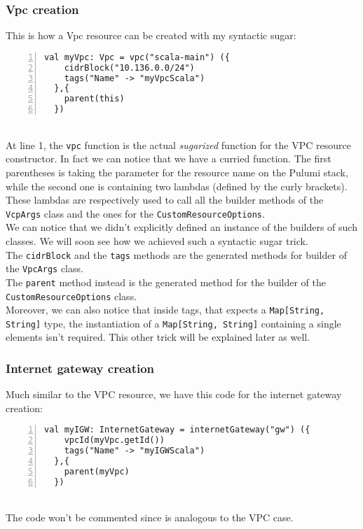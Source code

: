 \subsubsection{Vpc creation}
\label{sssec:vpc-creation-scala}
This is how a Vpc resource can be created with my syntactic sugar:
\begin{lstlisting}[numbers=left, numberstyle=\tiny, numbersep=-5pt, stepnumber=1]
  val myVpc: Vpc = vpc("scala-main") ({
    cidrBlock("10.136.0.0/24")
    tags("Name" -> "myVpcScala")
  },{
    parent(this)
  })
\end{lstlisting}\mbox{}\\
At line 1, the \texttt{vpc} function is the actual \textit{sugarized} function for the VPC resource constructor.
In fact we can notice that we have a curried function.
The first parentheses is taking the parameter for the resource name on the Pulumi stack, while the second one is containing two lambdas (defined by the curly brackets).
These lambdas are respectively used to call all the builder methods of the \texttt{VcpArgs} class and the ones for the \texttt{CustomResourceOptions}.\\
We can notice that we didn't explicitly defined an instance of the builders of such classes.
We will soon see how we achieved such a syntactic sugar trick.\\
The \texttt{cidrBlock} and the \texttt{tags} methods are the generated methods for builder of the \texttt{VpcArgs} class.\\ 
The \texttt{parent} method instead is the generated method for the builder of the \texttt{CustomResourceOptions} class.\\
Moreover, we can also notice that inside tags, that expects a \texttt{Map[String, String]} type, the instantiation of a \texttt{Map[String, String]} containing a single elements isn't required.
This other trick will be explained later as well.

\subsubsection{Internet gateway creation}
Much similar to the VPC resource, we have this code for the internet gateway creation:
\begin{lstlisting}[numbers=left, numberstyle=\tiny, numbersep=-5pt, stepnumber=1]
  val myIGW: InternetGateway = internetGateway("gw") ({
    vpcId(myVpc.getId())
    tags("Name" -> "myIGWScala")
  },{
    parent(myVpc)
  })
\end{lstlisting}\mbox{}\\
The code won't be commented since is analogous to the VPC case.

